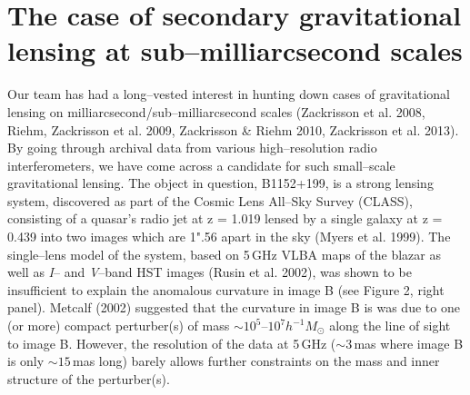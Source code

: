 \documentclass[a4paper, 11pt]{article}
\begin{document}
\section{The case of secondary gravitational lensing at sub--milliarcsecond scales}
Our team has had a long--vested interest in hunting down cases of gravitational lensing on milliarcsecond/sub--milliarcsecond scales (Zackrisson et al. 2008, Riehm, Zackrisson et al. 2009, Zackrisson \& Riehm 2010, Zackrisson et al. 2013). By going through archival data from various high--resolution radio interferometers, we have come across a candidate for such small--scale gravitational lensing. The object in question, B1152+199, is a strong lensing system, discovered as part of the Cosmic Lens All--Sky Survey (CLASS), consisting of a quasar's radio jet at z = 1.019 lensed by a single galaxy at z = 0.439 into two images which are 1".56 apart in the sky (Myers et al. 1999). The single--lens model of the system, based on 5\,GHz VLBA maps of the blazar as well as {\it I}-- and {\it V}--band HST images (Rusin et al. 2002), was shown to be insufficient to explain the anomalous curvature in image B (see Figure 2, right panel). Metcalf (2002) suggested that the curvature in image B is was due to one (or more) compact perturber(s) of mass $\sim10^5$--$10^7 h^{-1} M_\odot$ along the line of sight to image B. However, the resolution of the data at 5\,GHz ($\sim3$\,mas where image B is only $\sim15$\,mas long) barely allows further constraints on the mass and inner structure of the perturber(s).
\end{document}
